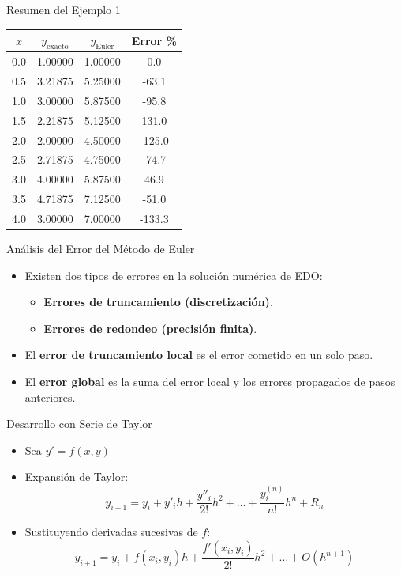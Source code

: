 \documentclass[main.tex]{subfiles}
\begin{document}
\begin{frame}{\small Resumen del Ejemplo 1}
\begin{center}
\begin{tabular}{|c|c|c|c|}
\hline
$x$ & $y_{\text{exacto}}$ & $y_{\text{Euler}}$ & Error \% \\
\hline
0.0 & 1.00000 & 1.00000 & 0.0 \\
0.5 & 3.21875 & 5.25000 & -63.1 \\
1.0 & 3.00000 & 5.87500 & -95.8 \\
1.5 & 2.21875 & 5.12500 & 131.0 \\
2.0 & 2.00000 & 4.50000 & -125.0 \\
2.5 & 2.71875 & 4.75000 & -74.7 \\
3.0 & 4.00000 & 5.87500 & 46.9 \\
3.5 & 4.71875 & 7.12500 & -51.0 \\
4.0 & 3.00000 & 7.00000 & -133.3 \\
\hline
\end{tabular}
\end{center}
\end{frame}

\begin{frame}{\small An\'alisis del Error del M\'etodo de Euler}
\begin{itemize}
  \item Existen dos tipos de errores en la soluci\'on num\'erica de EDO:
  \begin{itemize}
    \item \textbf{Errores de truncamiento (discretizaci\'on)}.
    \item \textbf{Errores de redondeo (precisi\'on finita)}.
  \end{itemize}
  \item El \textbf{error de truncamiento local} es el error cometido en un solo paso.
  \item El \textbf{error global} es la suma del error local y los errores propagados de pasos anteriores.
\end{itemize}
\end{frame}

\begin{frame}{\small Desarrollo con Serie de Taylor}
\begin{itemize}
  \item Sea \( y' = f(x, y) \)
  \item Expansi\'on de Taylor:
  \[
    y_{i+1} = y_i + y'_i h + \frac{y''_i}{2!}h^2 + \dots + \frac{y^{(n)}_i}{n!}h^n + R_n
  \]
  \item Sustituyendo derivadas sucesivas de $f$:
  \[
    y_{i+1} = y_i + f(x_i, y_i)h + \frac{f'(x_i, y_i)}{2!}h^2 + \dots + O(h^{n+1})
  \]
\end{itemize}
\end{frame}
\end{document}
